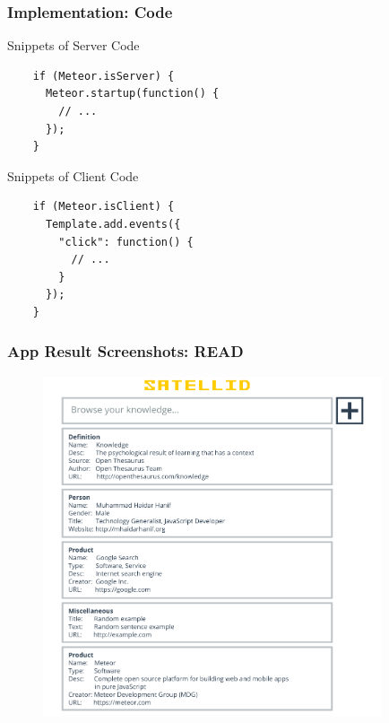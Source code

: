 \documentclass[10pt, compress]{beamer}
\begin{document}

\begin{frame}[fragile]
  \frametitle{Implementation: Code}

  Snippets of Server Code
  \begin{verbatim}
    if (Meteor.isServer) {
      Meteor.startup(function() {
        // ...
      });
    }
  \end{verbatim}

  Snippets of Client Code
  \begin{verbatim}
    if (Meteor.isClient) {
      Template.add.events({
        "click": function() {
          // ...
        }
      });
    }
  \end{verbatim}

\end{frame}


\begin{frame}[fragile]
  \frametitle{App Result Screenshots: READ}

  \begin{figure}[ht]
    \centering
    \vspace{-1cm}
    \includegraphics[height=10cm]{include/satellid-app-results_read.png}
    \vspace{-10pt}
    \label{fig:satellid-app-results_read}
  \end{figure}

\end{frame}
\end{document}
